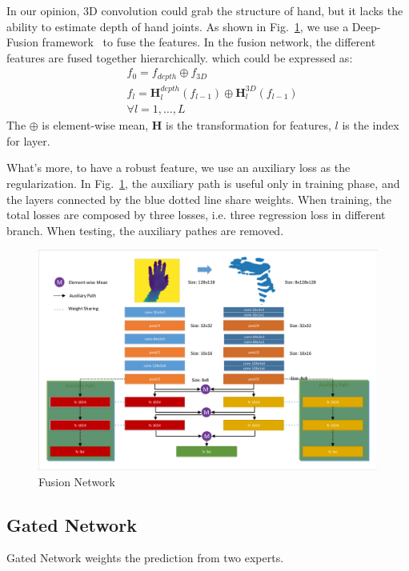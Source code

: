 \documentclass[journal,comsoc]{IEEEtran}
\let\MYoriglatexcaption\caption
\renewcommand{\caption}[2][\relax]{\MYoriglatexcaption[#2]{#2}}
\begin{document}
In our opinion, 3D convolution could grab the structure of hand, but it lacks the ability to estimate depth of hand joints. As shown in Fig.~\ref{fig:fusion network}, 
we use a Deep-Fusion framework~\cite{chen2016multi} to fuse the features. In the fusion network, the different features are fused together hierarchically. 
which could be expressed as: 
\begin{equation}\label{eq:deep fusion}
\begin{aligned}
&f_0 = f_{depth} \oplus f_{3D} \\
&f_l = \textbf{H}_l^{depth}(f_{l-1}) \oplus \textbf{H}_l^{3D}(f_{l-1}) \\
&\forall l=1, \dots , L
\end{aligned}
\end{equation}
The $\oplus$ is element-wise mean, $\textbf{H}$ is the transformation for features, $l$ is the index for layer.

What's more, to have a robust feature, we use an auxiliary loss as the regularization. In Fig.~\ref{fig:fusion network}, 
the auxiliary path is useful only in training phase, and the layers connected by the blue dotted line share weights. 
When training, the total losses are composed by three losses, i.e. three regression loss in different branch. 
When testing, the auxiliary pathes are removed.
\begin{figure}[t]
    \centering
    \includegraphics[width=1\linewidth]{src/network/fusion.pdf}
    \caption{Fusion Network}
\label{fig:fusion network}
\end{figure}

\subsection{Gated Network}\label{sec:gated network}
Gated Network weights the prediction from two experts.
\end{document}
